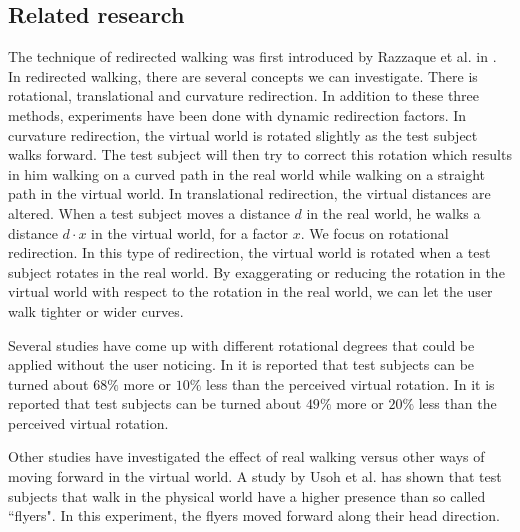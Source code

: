 \subsection{Related  research}
The technique of redirected walking was first introduced by Razzaque et al. in \cite{razzaque}. 
In redirected walking, there are several concepts we can investigate.
There is rotational, translational and curvature redirection.
In addition to these three methods, experiments have been done with dynamic redirection factors.\cite{neth}
In curvature redirection, the virtual world is rotated slightly as the test subject walks forward.
The test subject will then try to correct this rotation which results in him walking on a curved path in the real world while walking on a straight path in the virtual world.
In translational redirection, the virtual distances are altered.
When a test subject moves a distance $d$ in the real world, he walks a distance $d\cdot x$ in the virtual world, for a factor $x$.
We focus on rotational redirection.
In this type of redirection, the virtual world is rotated when a test subject rotates in the real world.
By exaggerating or reducing the rotation in the virtual world with respect to the rotation in the real world, we can let the user walk tighter or wider curves.

Several studies \cite{steinicke1}\cite{steinicke2} have come up with different rotational degrees that could be applied without the user noticing.
In \cite{steinicke1} it is reported that test subjects can be turned about $68\%$ more or $10\%$ less than the perceived virtual rotation. 
In \cite{steinicke2} it is reported that test subjects can be turned about $49\%$ more or $20\%$ less than the perceived virtual rotation. 

Other studies have investigated the effect of real walking versus other ways of moving forward in the virtual world.
A study by Usoh et al. \cite{usoh} has shown that test subjects that walk in the physical world have a higher presence than so called ``flyers".
In this experiment, the flyers moved forward along their head direction. 